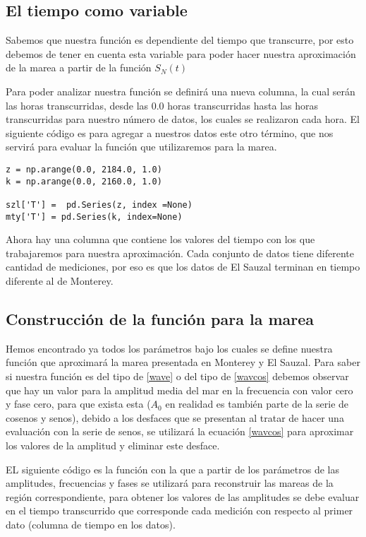 \subsection{El tiempo como variable}
\noindent Sabemos que nuestra función es dependiente del tiempo que transcurre, por esto debemos de tener en cuenta esta variable para poder hacer nuestra aproximación de la marea a partir de la función $S_N (t)$

Para poder analizar nuestra función se definirá una nueva columna, la cual serán las horas transcurridas, desde las 0.0 horas transcurridas hasta las horas transcurridas para nuestro número de datos, los cuales se realizaron cada hora. El siguiente código es para agregar a nuestros datos este otro término, que nos servirá para evaluar la función que utilizaremos para la marea.
\begin{verbatim}
z = np.arange(0.0, 2184.0, 1.0)
k = np.arange(0.0, 2160.0, 1.0)

szl['T'] =  pd.Series(z, index =None)
mty['T'] = pd.Series(k, index=None)
\end{verbatim}
Ahora hay una columna que contiene los valores del tiempo con los que trabajaremos para nuestra aproximación. Cada conjunto de datos tiene diferente cantidad de mediciones, por eso es que los datos de El Sauzal terminan en tiempo diferente al de Monterey.

\subsection{Construcción de la función para la marea}
\noindent Hemos encontrado ya todos los parámetros bajo los cuales se define nuestra función que aproximará la marea presentada en Monterey y El Sauzal. Para saber si nuestra función es del tipo de \ref{wave} o del tipo de \ref{wavcos} debemos observar que hay un valor para la amplitud media del mar en la frecuencia con valor cero y fase cero, para que exista esta ($A_0$  en realidad es también parte de la serie de cosenos y senos), debido a los desfaces que se presentan al tratar de hacer una evaluación con la serie de senos, se utilizará la ecuación \ref{wavcos} para aproximar los valores de la amplitud y eliminar este desface.

EL siguiente código es la función con la que a partir de los parámetros de las amplitudes, frecuencias y fases se utilizará para reconstruir las mareas de la región correspondiente, para obtener los valores de las amplitudes  se debe evaluar en el tiempo transcurrido que corresponde cada medición con respecto al primer dato (columna de tiempo en los datos).

